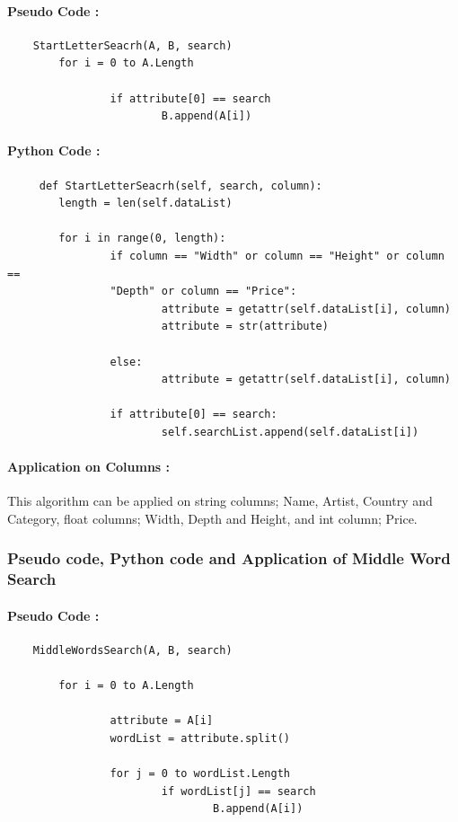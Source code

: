 \documentclass[12pt]{article}
\begin{document}
    \paragraph{Pseudo Code :}
    \begin{verbatim}
    StartLetterSeacrh(A, B, search)
        for i = 0 to A.Length
                
                if attribute[0] == search
                        B.append(A[i])
    \end{verbatim}
    \paragraph{Python Code :}
    \begin{verbatim}
     def StartLetterSeacrh(self, search, column):
        length = len(self.dataList)

        for i in range(0, length):
                if column == "Width" or column == "Height" or column ==
                "Depth" or column == "Price":
                        attribute = getattr(self.dataList[i], column)
                        attribute = str(attribute)

                else:
                        attribute = getattr(self.dataList[i], column)

                if attribute[0] == search:
                        self.searchList.append(self.dataList[i])
    \end{verbatim}
    \paragraph{Application on Columns :} 
    This algorithm can be applied on string columns; Name, Artist, Country and Category, float columns; Width, Depth and Height, and int column; Price.
    
    \newpage
    \subsubsection{Pseudo code, Python code and Application of Middle Word Search}
    \paragraph{Pseudo Code :}
    \begin{verbatim}
    MiddleWordsSearch(A, B, search)

        for i = 0 to A.Length
                
                attribute = A[i]
                wordList = attribute.split()

                for j = 0 to wordList.Length
                        if wordList[j] == search
                                B.append(A[i])
    \end{verbatim}
\end{document}
